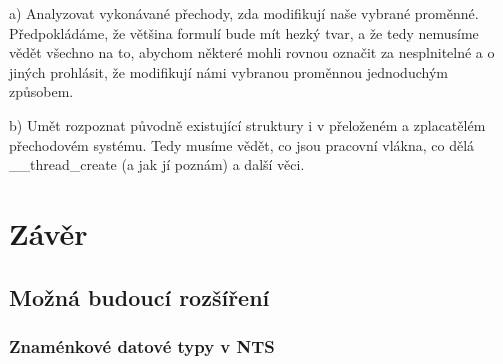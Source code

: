 \documentclass[10pt,a4paper,notitlepage]{report}
\begin{document}
a) Analyzovat vykonávané přechody, zda modifikují naše vybrané proměnné. Předpokládáme, že většina formulí bude mít hezký tvar, a že tedy nemusíme vědět všechno na to, abychom některé mohli rovnou označit za nesplnitelné a o jiných prohlásit, že modifikují námi vybranou proměnnou jednoduchým způsobem.

b) Umět rozpoznat původně existující struktury i v přeloženém a zplacatělém přechodovém systému. Tedy musíme vědět, co jsou pracovní vlákna, co dělá \_\_thread\_create (a jak jí poznám) a další věci.

\chapter{Závěr}
\section{Možná budoucí rozšíření}

\subsection{Znaménkové datové typy v NTS}


\tableofcontents
\end{document}
